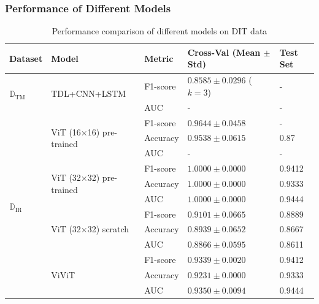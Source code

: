 \documentclass{beamer}
\begin{document}
\begin{frame}
  \frametitle{Performance of Different Models}
  \begin{table}[h]
  \centering
  \scriptsize
  \caption{Performance comparison of different models on \ac{DIT} data}
  \label{tab:results}
  \begin{tabularx}{\textwidth}{lXlll}
    \hline
    \textbf{Dataset} & \textbf{Model} & \textbf{Metric} & \textbf{Cross-Val (Mean $\pm$ Std)} & \textbf{Test Set} \\
    \hline
    \multirow{2}{*}{$\mathbb{D}_{\mathrm{TM}}$} & \multirow{2}{*}{TDL+CNN+LSTM} & F1-score & $0.8585 \pm 0.0296$ ($k=3$) & - \\
     & & AUC & - & - \\
    \hline
    \multirow{12}{*}{$\mathbb{D}_{\mathrm{IR}}$} & \multirow{3}{*}{ViT (16$\times$16) pre-trained} & F1-score & $0.9644 \pm 0.0458$ & - \\
     & & Accuracy & $0.9538 \pm 0.0615$ & 0.87 \\
     & & AUC & - & - \\
    \cline{2-5}
     & \multirow{3}{*}{ViT (32$\times$32) pre-trained} & F1-score & $1.0000 \pm 0.0000$ & 0.9412 \\
     & & Accuracy & $1.0000 \pm 0.0000$ & 0.9333 \\
     & & AUC & $1.0000 \pm 0.0000$ & 0.9444 \\
    \cline{2-5}
     & \multirow{3}{*}{ViT (32$\times$32) scratch} & F1-score & $0.9101 \pm 0.0665$ & 0.8889 \\
     & & Accuracy & $0.8939 \pm 0.0652$ & 0.8667 \\
     & & AUC & $0.8866 \pm 0.0595$ & 0.8611 \\
    \cline{2-5}
     & \multirow{3}{*}{ViViT} & F1-score & $0.9339 \pm 0.0020$ & 0.9412 \\
     & & Accuracy & $0.9231 \pm 0.0000$ & 0.9333 \\
     & & AUC & $0.9350 \pm 0.0094$ & 0.9444 \\
    \hline
  \end{tabularx}
\end{table}
\end{frame}
\end{document}
